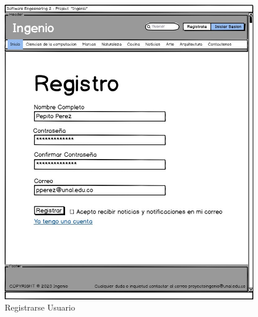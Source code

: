 \documentclass[a4paper,12 pt]{article}
\begin{document}
\begin{figure}[H]
    \centering
    \includegraphics[scale = 0.7]{images/RegistrarseUsuario.jpg}
    \caption{Registrarse Usuario}
    \label{F102}
\end{figure}{}
\end{document}
